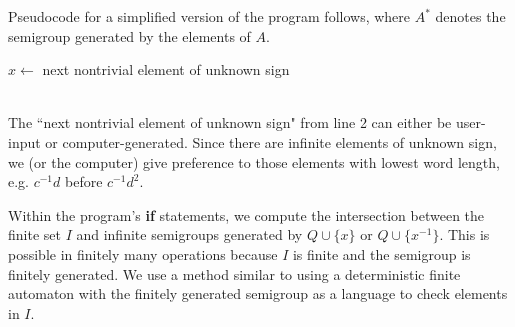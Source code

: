 


Pseudocode for a simplified version of the program follows, where $A^*$ denotes the semigroup generated by the elements of $A$.\\

\begin{algorithmic}
\LOOP
\STATE $x\gets$ next nontrivial element of unknown sign
  \ENDIF
\ENDLOOP
\end{algorithmic}
$\;$\\
The ``next nontrivial element of unknown sign" from line 2 can either be user-input or computer-generated. Since there are infinite elements of unknown sign, we (or the computer) give preference to those elements with lowest word length, e.g. $c^{-1}d$ before $c^{-1}d^2$.

Within the program's \textbf{if} statements, we compute the intersection between the finite set $I$ and infinite semigroups generated by $Q\cup{}\{x\}$ or $Q\cup{}\{x^{-1}\}$. This is possible in finitely many operations because $I$ is finite and the semigroup is finitely generated. We use a method similar to using a deterministic finite automaton with the finitely generated semigroup as a language to check elements in $I$.


